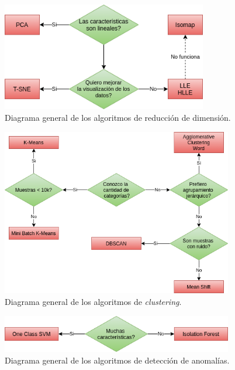 \documentclass[a4paper,12pt]{article}
\begin{document}
\begin{figure}[H]
	\begin{center}				
		\includegraphics[width=0.8\textwidth]{dimreduxdiagram.png}
		\caption{Diagrama general de los algoritmos de reducción de dimensión.}
		\label{fig:dimreduxdiagram.}
	\end{center}
\end{figure}

\begin{figure}[H]
	\begin{center}				
		\includegraphics[width=0.9\textwidth]{clusteringdiagram.png}
		\caption{Diagrama general de los algoritmos de \textit{clustering}.}
		\label{fig:clusteringdiagram.}
	\end{center}
\end{figure}

\begin{figure}[H]
	\begin{center}				
		\includegraphics[width=0.9\textwidth]{anomalydiagram.png}
		\caption{Diagrama general de los algoritmos de detección de anomalías.}
		\label{fig:anomalydiagram.}
	\end{center}
\end{figure}
\end{document}
